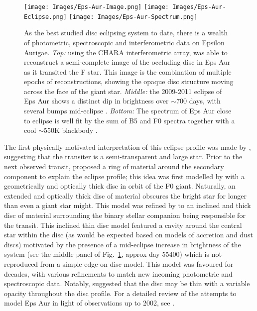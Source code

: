 \documentclass[%
 reprint,
 amsmath,amssymb,
 aps,
rmp,
floatfix,
]{revtex4-2}
\begin{document}
\begin{figure}
    \centering
    \texttt{[image: Images/Eps-Aur-Image.png]}
    \texttt{[image: Images/Eps-Aur-Eclipse.png]}
    \texttt{[image: Images/Eps-Aur-Spectrum.png]}
    \caption{As the best studied disc eclipsing system to date, there is a wealth of photometric, spectroscopic and interferometric data on Epsilon Aurigae. \emph{Top:} using the CHARA interferometric array, \citet{Kloppenborg2015ApJS} was able to reconstruct a semi-complete image of the occluding disc in Eps Aur as it transited the F star. This image is the combination of multiple epochs of reconstructions, showing the opaque disc structure moving across the face of the giant star. \emph{Middle:} the 2009-2011 eclipse of Eps Aur shows a distinct dip in brightness over $\sim 700$ days, with several bumps mid-eclipse \citep{Stencel2011AJ}. \emph{Bottom:} The spectrum of Eps Aur close to eclipse is well fit by the sum of B5 and F0 spectra together with a cool $\sim 550$K blackbody \citep{Hoard2010ApJ}.}
    \label{fig:eps-aur}
\end{figure}

The first physically motivated interpretation of this eclipse profile was made by \citet{Kuiper1937ApJ}, suggesting that the transiter is a semi-transparent and large star. Prior to the next observed transit, \citet{Kopal1954Obs} proposed a ring of material around the secondary component to explain the eclipse profile; this idea was first modelled by \citet{Huang1965ApJ} with a geometrically and optically thick disc in orbit of the F0 giant. Naturally, an extended and optically thick disc of material obscures the bright star for longer than even a giant star might. This model was refined by \citet{Wilson1971ApJ} to an inclined and thick disc of material surrounding the binary stellar companion being responsible for the transit. This inclined thin disc model featured a cavity around the central star within the disc (as would be expected based on models of accretion and dust discs) motivated by the presence of a mid-eclipse increase in brightness of the system (see the middle panel of Fig.~\ref{fig:eps-aur}, approx day 55400) which is not reproduced from a simple edge-on disc model. This model was favoured for decades, with various refinements to match new incoming photometric and spectroscopic data. Notably, \citet{Carroll1991ApJ} suggested that the disc may be thin with a variable opacity throughout the disc profile. For a detailed review of the attempts to model Eps Aur in light of observations up to 2002, see \citet{Guinan2002ASPC}.
\end{document}
